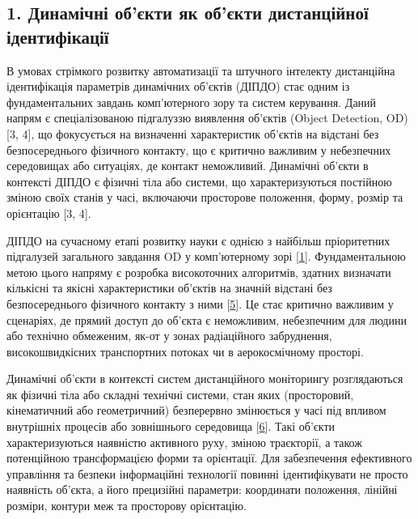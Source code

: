 \documentclass[
]{article}
\begin{document}
\subsection{1. Динамічні об'єкти як об'єкти дистанційної ідентифікації}\label{ux434ux438ux43dux430ux43cux456ux447ux43dux456-ux43eux431ux454ux43aux442ux438-ux44fux43a-ux43eux431ux454ux43aux442ux438-ux434ux438ux441ux442ux430ux43dux446ux456ux439ux43dux43eux457-ux456ux434ux435ux43dux442ux438ux444ux456ux43aux430ux446ux456ux457}

В умовах стрімкого розвитку автоматизації та штучного інтелекту дистанційна ідентифікація параметрів динамічних об'єктів (ДІПДО) стає одним із фундаментальних завдань комп'ютерного зору та систем керування. Даний напрям є спеціалізованою підгалуззю виявлення об'єктів (Object Detection, OD) {[}3, 4{]}, що фокусується на визначенні характеристик об'єктів на відстані без безпосереднього фізичного контакту, що є критично важливим у небезпечних середовищах або ситуаціях, де контакт неможливий. Динамічні об'єкти в контексті ДІПДО є фізичні тіла або системи, що характеризуються постійною зміною своїх станів у часі, включаючи просторове положення, форму, розмір та орієнтацію {[}3, 4{]}.

ДІПДО на сучасному етапі розвитку науки є однією з найбільш пріоритетних підгалузей загального завдання OD у комп'ютерному зорі {[}\hyperref[_Ref221440208]{1}{]}. Фундаментальною метою цього напряму є розробка високоточних алгоритмів, здатних визначати кількісні та якісні характеристики об'єктів на значній відстані без безпосереднього фізичного контакту з ними {[}\hyperref[_Ref221441123]{5}{]}. Це стає критично важливим у сценаріях, де прямий доступ до об'єкта є неможливим, небезпечним для людини або технічно обмеженим, як-от у зонах радіаційного забруднення, високошвидкісних транспортних потоках чи в аерокосмічному просторі.

Динамічні об'єкти в контексті систем дистанційного моніторингу розглядаються як фізичні тіла або складні технічні системи, стан яких (просторовий, кінематичний або геометричний) безперервно змінюється у часі під впливом внутрішніх процесів або зовнішнього середовища {[}\hyperref[_Ref221397736]{6}{]}. Такі об'єкти характеризуються наявністю активного руху, зміною траєкторії, а також потенційною трансформацією форми та орієнтації. Для забезпечення ефективного управління та безпеки інформаційні технології повинні ідентифікувати не просто наявність об'єкта, а його прецизійні параметри: координати положення, лінійні розміри, контури меж та просторову орієнтацію.
\end{document}
